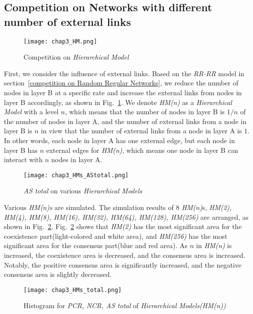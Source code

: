 \subsection{Competition on Networks with different number of external links}

\begin{figure}[!htb]
	\centering
	\texttt{[image: chap3\_HM.png]}
	\caption{Competition on \textit{Hierarchical Model}}
	\label{chap3_HM}
\end{figure}
First, we consider the influence of external links. Based on the \textit{RR-RR} model in section~\ref{competition on Random Regular Networks}, we reduce the number of nodes in layer B at a specific rate and increase the external links from nodes in layer B accordingly, as shown in Fig.~\ref{chap3_HM}.  We denote \textit{HM(n)} as a \textit{Hierarchical Model} with a level $n$, which means that the number of nodes in layer B is $1/n$ of the number of nodes in layer A, and the number of external links from a node in layer B is $n$ in view that the number of external links from a node in layer A is $1$. In other words, each node in layer A has one external edge, but each node in layer B has $n$ external edges for \textit{HM(n)}, which means one node in layer B can interact with $n$ nodes in layer A.

\begin{figure}[!htb]
	\centering
	\texttt{[image: chap3\_HMs\_AStotal.png]}
	\caption{\textit{AS total} on various \textit{Hierarchical Models}}
	\label{chap3_HMs_AStotal}
\end{figure}

Various \textit{HM(n)s} are simulated.  The simulation results of $8$ \textit{HM(n)}s, \textit{HM(2), HM(4), HM(8), HM(16), HM(32), HM(64), HM(128), HM(256)} are arranged, as shown in Fig.~\ref{chap3_HMs_AStotal}. Fig.~\ref{chap3_HMs_AStotal} shows that \textit{HM(2)} has the most significant area for the coexistence part(light-colored and white area), and \textit{HM(256)} has the most significant area for the consensus part(blue and red area). As $n$ in \textit{HM(n)} is increased, the coexistence area is decreased, and the consensus area is increased. Notably, the positive consensus area is significantly increased, and the negative consensus area is slightly decreased.

\begin{figure}[!htb]
	\centering
	\texttt{[image: chap3\_HMs\_total.png]}
	\caption{Histogram for \textit{PCR, NCR, AS total} of \textit{Hierarchical Models(HM(n))}}
	\label{chap3_HMs_total}
\end{figure}


